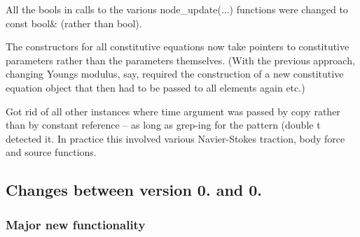 \begin{DoxyItemize}
\item All the bools in calls to the various {\ttfamily node\+\_\+update}(...) functions were changed to {\ttfamily const} {\ttfamily bool\&} (rather than {\ttfamily bool}). ~\newline
~\newline

\item The constructors for all constitutive equations now take pointers to constitutive parameters rather than the parameters themselves. (With the previous approach, changing Young\textquotesingle{}s modulus, say, required the construction of a new constitutive equation object that then had to be passed to all elements again etc.) ~\newline
~\newline

\item Got rid of all other instances where time argument was passed by copy rather than by constant reference -- as long as grep-\/ing for the pattern \textquotesingle{}(double t\textquotesingle{} detected it. In practice this involved various Navier-\/\+Stokes traction, body force and source functions.
\end{DoxyItemize}



 

\hypertarget{index_zero_point_eight_to_zero_point_five}{}\subsection{Changes between version 0. and 0.}\label{index_zero_point_eight_to_zero_point_five}
\hypertarget{index_new_functionality_zero_point_five}{}\subsubsection{Major new functionality}\label{index_new_functionality_zero_point_five}

